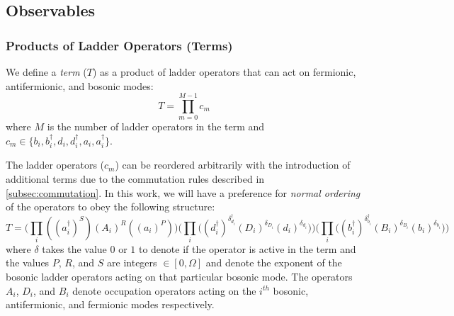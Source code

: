 




\subsection{Observables}
\label{subsec:observables}

\subsubsection{Products of Ladder Operators (Terms)}

We define a \textit{term} ($T$) as a product of ladder operators that can act on fermionic, antifermionic, and bosonic modes:
\begin{equation}
    T = \prod_{m=0}^{M-1} c_m
\end{equation}
where $M$ is the number of ladder operators in the term and $c_m \in \{b_i, b_i^\dagger, d_i, d_i^\dagger, a_i, a_i^\dagger\}$.

The ladder operators ($c_m$) can be reordered arbitrarily with the introduction of additional terms due to the commutation rules described in \ref{subsec:commutation}.
In this work, we will have a preference for \textit{normal ordering} of the operators to obey the following structure:
\begin{equation}
    T = \Big( \prod_i ((a_i^\dagger)^S)(A_i)^R((a_i)^P) \Big) \Big( \prod_i \big( (d_i^\dagger)^{\delta_{d_i}^{\dagger}} (D_i)^{\delta_{D_i}} (d_i)^{\delta_{d_i}} \big) \Big) \Big( \prod_i \big( (b_i^\dagger)^{\delta_{b_i}^{\dagger}} (B_i)^{\delta_{B_i}} (b_i)^{\delta_{b_i}} \big) \Big) 
\end{equation}
where $\delta$ takes the value $0$ or $1$ to denote if the operator is active in the term and the values $P$, $R$, and $S$ are integers $\in [0, \Omega]$ and denote the exponent of the bosonic ladder operators acting on that particular bosonic mode.
The operators $A_i$, $D_i$, and $B_i$ denote occupation operators acting on the $i^{th}$ bosonic, antifermionic, and fermionic modes respectively.

